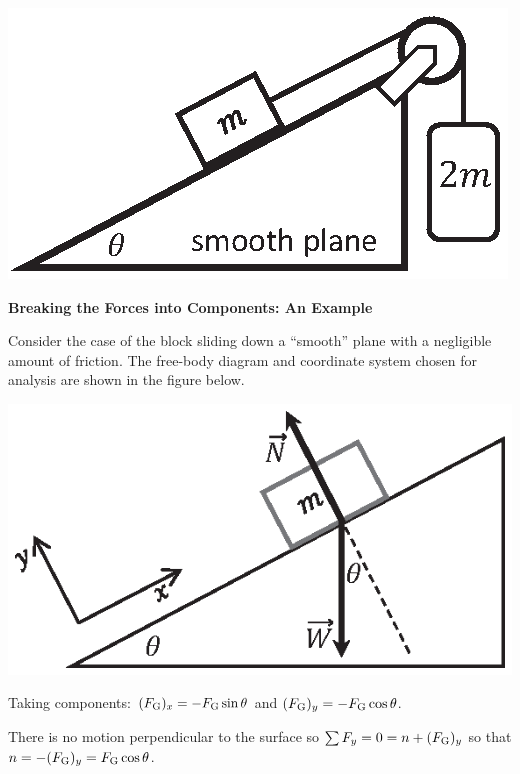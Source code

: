 \vspace{0.3cm}
{\par\centering \includegraphics{friction/smooth_plane_pulley.eps} \par}
\vspace{0.3cm}

\textbf{Breaking the Forces into Components: An Example} 

Consider the case of the block sliding down a ``smooth'' plane
with a negligible amount of friction. The free-body diagram and coordinate system
chosen for analysis are shown in the figure below.

\vspace{0.3cm}
{\par\centering \includegraphics{friction/force_diagram2.eps} \par}
\vspace{0.3cm}

Taking components: \( (F_{\rm G})_{x}  = -F_{\rm G} \sin  \theta  \) and \((F_{\rm G})_{y} = -F_{\rm G}
\cos  \theta  \).

There is no motion perpendicular to the surface so \( \sum F_y
= 0 = n + (F_{\rm G})_{y} \) so that $n = -(F_{\rm G})_{y}  = F_{\rm G} \cos \theta$.

